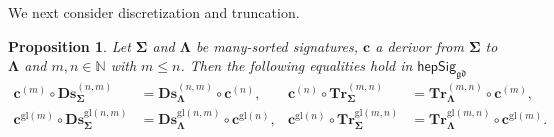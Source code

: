 \documentclass[a4paper, reqno
]{amsart}
\newcommand{\sig}[1]{\mathbf{#1}}             %
\newcommand{\gd}{\mathfrak{gd}}              %
\newcommand{\gl}{\mathrm{gl}}                %
\newcommand{\bDs}{\mathbf{Ds}}
\newcommand{\bTr}{\mathbf{Tr}}
\theoremstyle{plain}
\newtheorem{proposition}[theorem]{Proposition}
\theoremstyle{definition}
\begin{document}
We next consider discretization and truncation.

\begin{proposition}\label{PChangeSigDsTr}
Let $\sig{\Sigma}$ and $\sig{\Lambda}$ be many-sorted signatures, $\mathbf{c}$ a derivor from $\sig{\Sigma}$ to $\sig{\Lambda}$ and $m,n\in\mathbb{N}$ with $m\leq n$.
Then the following equalities hold in $\mathsf{hepSig}_{\gd}$
\begin{align*}
\mathbf{c}^{(m)}\circ\bDs^{(n,m)}_{\sig{\Sigma}}&=\bDs^{(n,m)}_{\sig{\Lambda}}\circ\mathbf{c}^{(n)},
&
\mathbf{c}^{(n)}\circ\bTr^{(m,n)}_{\sig{\Sigma}}&=\bTr^{(m,n)}_{\sig{\Lambda}}\circ\mathbf{c}^{(m)},
\\
\mathbf{c}^{\gl(m)}\circ\bDs^{\gl(n,m)}_{\sig{\Sigma}}&=\bDs^{\gl(n,m)}_{\sig{\Lambda}}\circ\mathbf{c}^{\gl(n)},
&
\mathbf{c}^{\gl(n)}\circ\bTr^{\gl(m,n)}_{\sig{\Sigma}}&=\bTr^{\gl(m,n)}_{\sig{\Lambda}}\circ\mathbf{c}^{\gl(m)}.
\end{align*}
\end{proposition}
\end{document}
